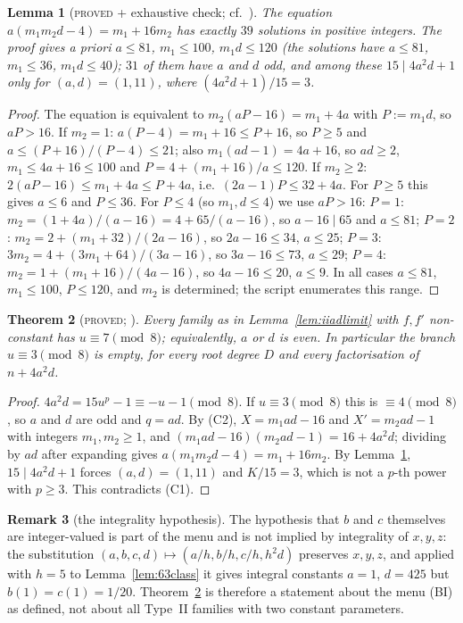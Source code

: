 \documentclass[11pt,reqno]{amsart}
\newtheorem{theorem}{Theorem}[section]
\newtheorem{lemma}[theorem]{Lemma}
\theoremstyle{definition}
\newtheorem{remark}[theorem]{Remark}
\newcommand{\status}[1]{\textup{\textsc{#1}}}
\begin{document}
\begin{lemma}[\status{proved} + exhaustive check; cf.\ {\cite[Lemma~2.2$'$]{Exp15}}]\label{lem:boxed}
The equation $a(m_1m_2d-4)=m_1+16m_2$ has exactly $39$ solutions in positive
integers.  The proof gives a priori $a\le81$, $m_1\le100$, $m_1d\le120$
(the solutions have $a\le81$, $m_1\le36$, $m_1d\le40$);%
 $31$ of them have
$a$ and $d$ odd, and among these $15\mid4a^2d+1$ only for $(a,d)=(1,11)$,
where $(4a^2d+1)/15=3$.
\end{lemma}

\begin{proof}
The equation is equivalent to $m_2(aP-16)=m_1+4a$ with $P:=m_1d$, so $aP>16$.
If $m_2=1$: $a(P-4)=m_1+16\le P+16$, so $P\ge5$ and $a\le(P+16)/(P-4)\le21$;
also $m_1(ad-1)=4a+16$, so $ad\ge2$, $m_1\le4a+16\le100$ and
$P=4+(m_1+16)/a\le120$.  If $m_2\ge2$: $2(aP-16)\le m_1+4a\le P+4a$, i.e.\
$(2a-1)P\le32+4a$.  For $P\ge5$ this gives $a\le6$ and $P\le36$.  For
$P\le4$ (so $m_1,d\le4$) we use $aP>16$:
$P=1$: $m_2=(1+4a)/(a-16)=4+65/(a-16)$, so $a-16\mid65$ and $a\le81$;
$P=2$: $m_2=2+(m_1+32)/(2a-16)$, so $2a-16\le34$, $a\le25$;
$P=3$: $3m_2=4+(3m_1+64)/(3a-16)$, so $3a-16\le73$, $a\le29$;
$P=4$: $m_2=1+(m_1+16)/(4a-16)$, so $4a-16\le20$, $a\le9$.
In all cases $a\le81$, $m_1\le100$, $P\le120$, and $m_2$ is determined; the
script enumerates this range.
\end{proof}

\begin{theorem}[\status{proved}; {\cite[Thm.~2.2]{Exp15}}]\label{thm:iiad3}
Every family as in Lemma~\ref{lem:iiadlimit} with $f,f'$ non-constant has
$u\equiv7\pmod8$; equivalently, $a$ or $d$ is even.  In particular the
branch $u\equiv3\pmod8$ is empty, for every root degree $D$ and every
factorisation of $n+4a^2d$.
\end{theorem}

\begin{proof}
$4a^2d=15u^p-1\equiv-u-1\pmod8$.  If $u\equiv3\pmod8$ this is $\equiv4\pmod
8$, so $a$ and $d$ are odd and $q=ad$.  By (C2), $X=m_1ad-16$ and
$X'=m_2ad-1$ with integers $m_1,m_2\ge1$, and
$(m_1ad-16)(m_2ad-1)=16+4a^2d$; dividing by $ad$ after expanding gives
$a(m_1m_2d-4)=m_1+16m_2$.  By Lemma~\ref{lem:boxed}, $15\mid4a^2d+1$ forces
$(a,d)=(1,11)$ and $K/15=3$, which is not a $p$-th power with $p\ge3$.  This
contradicts (C1).
\end{proof}

\begin{remark}[the integrality hypothesis]\label{rem:iiadhyp}
The hypothesis that $b$ and $c$ themselves are integer-valued is part of
the menu and is not implied by integrality of $x,y,z$: the substitution
$(a,b,c,d)\mapsto(a/h,b/h,c/h,h^2d)$ preserves $x,y,z$, and applied with
$h=5$ to Lemma~\ref{lem:63class} it gives integral constants $a=1$,
$d=425$ but $b(1)=c(1)=1/20$.  Theorem~\ref{thm:iiad3} is therefore a
statement about the menu (BI) as defined, not about all Type~II families
with two constant parameters.
\end{remark}
\end{document}

